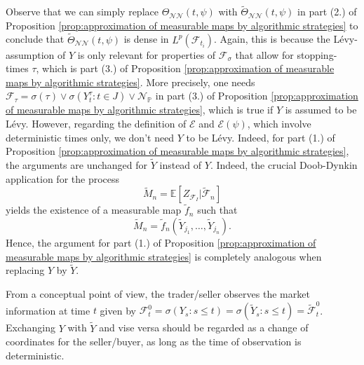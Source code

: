 \documentclass[11pt,a4paper,twoside,openany]{report}
\numberwithin{equation}{section}
\theoremstyle{plain} %
\theoremstyle{definition} %
\theoremstyle{remark} %
\begin{document}
 
 Observe that we can simply replace \({\Theta}_{\mathcal{NN}}(t,\psi)\) with \(\widetilde{\Theta}_{\mathcal{NN}}(t,\psi)\) in part (2.) of  Proposition \ref{prop:approximation of measurable maps by algorithmic strategies} to conclude that \(\widetilde{\Theta}_{\mathcal{NN}}(t,\psi)\) is dense in \(L^p({\mathcal{F}_{t_i}})\). Again, this is because the Lévy-assumption of \(Y\) is only relevant for properties of \(\mathcal{F}_{\sigma}\) that allow for stopping-times \(\tau\), which is part (3.) of Proposition \ref{prop:approximation of measurable maps by algorithmic strategies}. More precisely, one needs \(\mathcal{F}_{\tau}=\sigma(\tau)\vee\sigma(Y_t^{\tau}:t\in J)\vee\mathcal{N}_{\mathbb{P}}\) in part (3.) of Proposition \ref{prop:approximation of measurable maps by algorithmic strategies}, which is true if \(Y\) is assumed to be Lévy. However, regarding the definition of \(\mathcal{E}\) and \(\mathcal{E}(\psi)\), which involve deterministic times only, we don't need \(Y\) to be Lévy. Indeed, for part (1.) of Proposition \ref{prop:approximation of measurable maps by algorithmic strategies}, the arguments are unchanged for \(\widetilde{Y}\) instead of \(Y\). Indeed, the crucial Doob-Dynkin application for the process 
 \begin{equation*}
     \widetilde{M}_n=\mathbb{E}[Z_{\mathcal{F}_I}|\widetilde{\mathcal{F}}_n]
 \end{equation*}
 yields the existence of a measurable map \(\widetilde{f}_n\) such that
 \begin{equation*}
      \widetilde{M}_n=\widetilde{f}_n(\widetilde{Y}_{j_1},\dots,\widetilde{Y}_{j_n}).
 \end{equation*}
 Hence, the argument for part (1.) of Proposition \ref{prop:approximation of measurable maps by algorithmic strategies} is  completely analogous when replacing \(Y\) by \(\widetilde{Y}\).
 
 
 From a conceptual point of view, the trader/seller observes the market information at time \(t\) given by \(\mathcal{F}_t^0=\sigma(Y_s:s\leq t)=\sigma(\widetilde{Y}_s:s\leq t)=\widetilde{\mathcal{F}}_t^0\). Exchanging \(Y\) with \(\widetilde{Y}\) and vise versa should  be regarded as a change of coordinates for the seller/buyer, as long as the time of observation is deterministic. 
\end{document}
